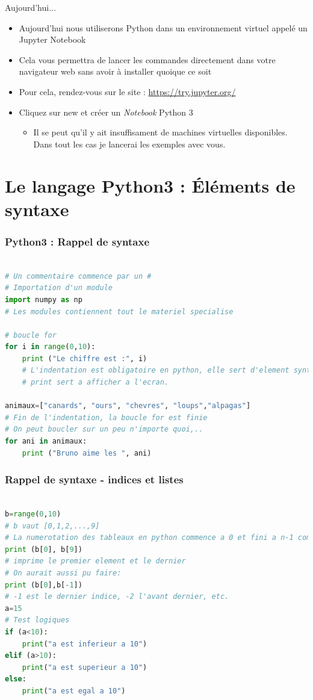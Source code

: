 \documentclass[]{beamer}
\begin{document}
\begin{frame}[fragile]{Aujourd'hui...}
\begin{itemize}
\item Aujourd'hui nous utiliserons Python dans un environnement virtuel appelé un Jupyter Notebook
\item Cela vous permettra de lancer les commandes directement dans votre navigateur web sans avoir à installer quoique ce soit
\item Pour cela, rendez-vous sur le site : \url{https://try.jupyter.org/}
\item Cliquez sur new et créer un \textit{Notebook} Python 3
\begin{itemize}
\item Il se peut qu'il y ait insuffisament de machines virtuelles disponibles. Dans tout les cas je lancerai les exemples avec vous.
\end{itemize}
\end{itemize}
\end{frame}

\section{Le langage Python3 : Éléments de syntaxe}
\begin{frame}[fragile]
\frametitle{Python3 : Rappel de syntaxe }


\begin{lstlisting}[language=Python]

# Un commentaire commence par un #
# Importation d'un module
import numpy as np
# Les modules contiennent tout le materiel specialise

# boucle for
for i in range(0,10):
    print ("Le chiffre est :", i)
    # L'indentation est obligatoire en python, elle sert d'element syntaxique
    # print sert a afficher a l'ecran.
    
animaux=["canards", "ours", "chevres", "loups","alpagas"]
# Fin de l'indentation, la boucle for est finie
# On peut boucler sur un peu n'importe quoi,..
for ani in animaux:
    print ("Bruno aime les ", ani)

\end{lstlisting}
\end{frame}

\begin{frame}[fragile]
\frametitle{Rappel de syntaxe - indices et listes }


\begin{lstlisting}[language=Python]

b=range(0,10)
# b vaut [0,1,2,...,9]
# La numerotation des tableaux en python commence a 0 et fini a n-1 comme en C
print (b[0], b[9])
# imprime le premier element et le dernier
# On aurait aussi pu faire:
print (b[0],b[-1])
# -1 est le dernier indice, -2 l'avant dernier, etc.
a=15
# Test logiques
if (a<10):
    print("a est inferieur a 10")
elif (a>10):
    print("a est superieur a 10")
else:
    print("a est egal a 10")

\end{lstlisting}
\end{frame}
\end{document}
